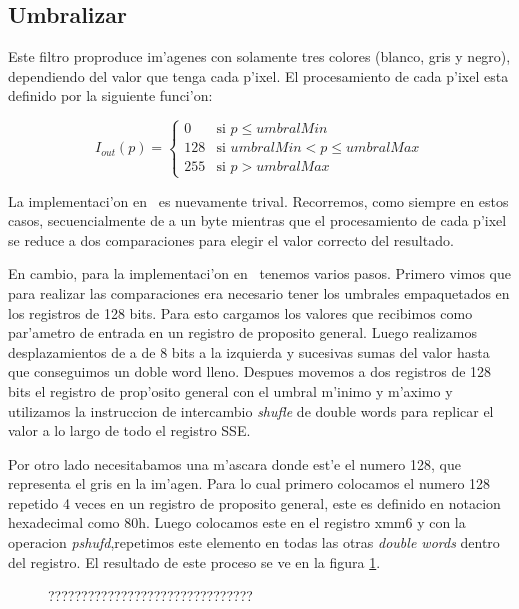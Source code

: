 \subsection{Umbralizar}
Este filtro proproduce im'agenes con solamente tres colores (blanco, gris y negro), dependiendo del valor que tenga cada p'ixel.
El procesamiento de cada p'ixel esta definido por la siguiente funci'on:

$$I_{out}(p) = \left\{\begin{array}{lcc} 0 & \text{si } p \leq umbralMin\\  128 & \text{si } umbralMin < p \leq umbralMax \\ 255 & \text{si } p > umbralMax \end{array} \right. $$

La implementaci'on en \C\ es nuevamente trival. Recorremos, como siempre en estos casos, secuencialmente de a un byte mientras que el procesamiento de cada p'ixel se reduce a dos comparaciones para elegir el valor correcto del resultado.

En cambio, para la implementaci'on en \ass\ tenemos varios pasos. Primero vimos que para realizar las comparaciones era necesario tener los umbrales empaquetados en los registros de 128 bits. Para esto cargamos los valores que recibimos como par'ametro de entrada en un registro de proposito general. Luego realizamos desplazamientos de a de 8 bits a la izquierda y sucesivas sumas del valor hasta que conseguimos un doble word lleno. Despues movemos a dos registros de 128 bits el registro de prop'osito general con el umbral m'inimo y m'aximo y utilizamos la instruccion de intercambio \textit{shufle} de double words para replicar el valor a lo largo de todo el registro SSE.

Por otro lado necesitabamos una m'ascara donde est'e el numero 128, que representa el gris en la im'agen.
Para lo cual primero colocamos el numero 128 repetido 4 veces en un registro de proposito general,  
este es definido en notacion hexadecimal como 80h. Luego colocamos este en el registro xmm6 y con la operacion 
\textit{pshufd},repetimos este elemento en todas las otras \textit{double words} dentro del registro.
El resultado de este proceso se ve en la figura \ref{est:u-uno}.

\begin{figure}[h!]
\caption{???????????????????????????????}
\label{est:u-uno}
\end{figure}

